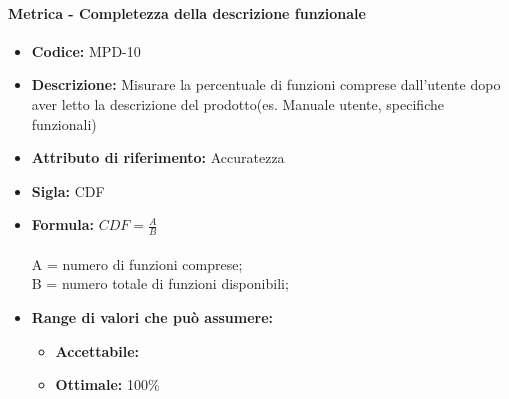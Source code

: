                   \paragraph{Metrica - Completezza della descrizione funzionale} 
            \begin{itemize}
           \item   \textbf{Codice:} MPD-10
           \item   \textbf{Descrizione:} Misurare la percentuale di funzioni comprese dall'utente dopo aver letto la descrizione del prodotto(es. Manuale utente, specifiche funzionali) 
           \item    \textbf{Attributo di riferimento:} Accuratezza
           \item   \textbf{Sigla:} CDF
           \item   \textbf{Formula:} \begin{math}CDF = \frac{A}{B}\end{math}\\ \\
            A = numero di funzioni comprese;\\
            B = numero totale di funzioni disponibili;
            \item \textbf{Range di valori che può assumere:}
        \begin{itemize}
            \item \textbf{Accettabile:} 
            \item \textbf{Ottimale:} 100\%
        \end{itemize}
       \end{itemize}
       
              
                
       
                 
       
       

